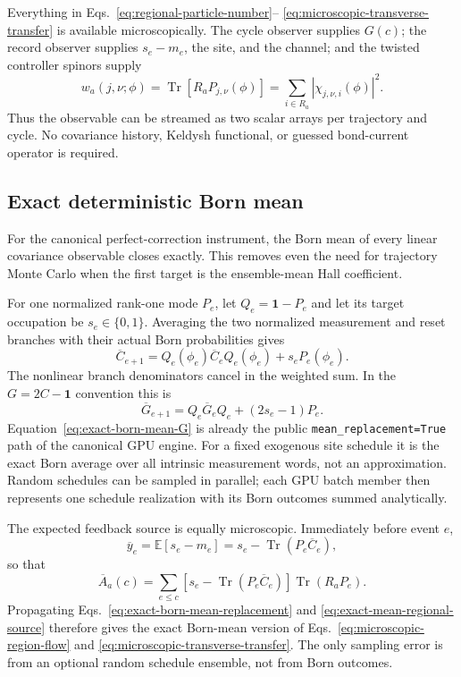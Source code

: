 \documentclass[aps,prb,onecolumn,nofootinbib,superscriptaddress]{revtex4-2}
\newcommand{\Id}{\mathbf{1}}
\newcommand{\Tr}{\operatorname{Tr}}
\newcommand{\E}{\mathbb{E}}
\newcommand{\code}[1]{\texttt{#1}}
\begin{document}
Everything in Eqs.~\eqref{eq:regional-particle-number}--
\eqref{eq:microscopic-transverse-transfer} is available microscopically.  The
cycle observer supplies $G(c)$; the record observer supplies $s_e-m_e$, the
site, and the channel; and the twisted controller spinors supply
\begin{equation}
  w_a(j,\nu;\phi)
  =\Tr\!\left[R_aP_{j,\nu}(\phi)\right]
  =\sum_{i\in R_a}|\chi_{j,\nu,i}(\phi)|^2.
  \label{eq:regional-controller-weight}
\end{equation}
Thus the observable can be streamed as two scalar arrays per trajectory and
cycle.  No covariance history, Keldysh functional, or guessed bond-current
operator is required.

\subsection{Exact deterministic Born mean}

For the canonical perfect-correction instrument, the Born mean of every linear
covariance observable closes exactly.  This removes even the need for
trajectory Monte Carlo when the first target is the ensemble-mean Hall
coefficient.

For one normalized rank-one mode $P_e$, let $Q_e=\Id-P_e$ and let its target
occupation be $s_e\in\{0,1\}$.  Averaging the two normalized measurement and
reset branches with their actual Born probabilities gives
\begin{equation}
  \overline C_{e+1}
  =Q_e(\phi_e)\overline C_eQ_e(\phi_e)
   +s_eP_e(\phi_e).
  \label{eq:exact-born-mean-replacement}
\end{equation}
The nonlinear branch denominators cancel in the weighted sum.  In the
$G=2C-\Id$ convention this is
\begin{equation}
  \overline G_{e+1}
  =Q_e\overline G_eQ_e+(2s_e-1)P_e.
  \label{eq:exact-born-mean-G}
\end{equation}
Equation~\eqref{eq:exact-born-mean-G} is already the public
\code{mean\_replacement=True} path of the canonical GPU engine.  For a fixed
exogenous site schedule it is the exact Born average over all intrinsic
measurement words, not an approximation.  Random schedules can be sampled in
parallel; each GPU batch member then represents one schedule realization with
its Born outcomes summed analytically.

The expected feedback source is equally microscopic.  Immediately before
event $e$,
\begin{equation}
  \overline y_e
  =\E[s_e-m_e]
  =s_e-\Tr(P_e\overline C_e),
  \label{eq:exact-mean-transfer}
\end{equation}
so that
\begin{equation}
  \overline A_a(c)
  =\sum_{e\le c}
  \left[s_e-\Tr(P_e\overline C_e)\right]
  \Tr(R_aP_e).
  \label{eq:exact-mean-regional-source}
\end{equation}
Propagating Eqs.~\eqref{eq:exact-born-mean-replacement} and
\eqref{eq:exact-mean-regional-source} therefore gives the exact Born-mean
version of Eqs.~\eqref{eq:microscopic-region-flow} and
\eqref{eq:microscopic-transverse-transfer}.  The only sampling error is from an
optional random schedule ensemble, not from Born outcomes.
\end{document}
